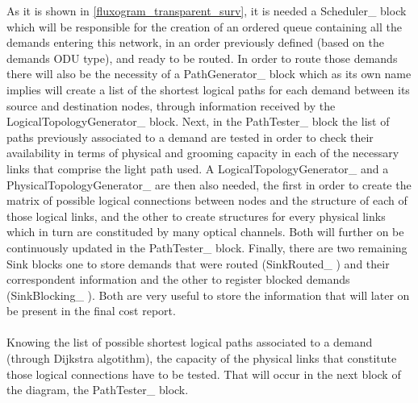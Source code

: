 \normalsize As it is shown in \ref{fluxogram_transparent_surv}, it is needed a Scheduler\_  block which will be responsible for the creation of an ordered queue containing all the demands entering this network, in an order previously defined (based on the demands ODU type), and ready to be routed.
In order to route those demands there will also be the necessity of a PathGenerator\_  block which as its own name implies will create a list of the shortest logical paths for each demand between its source and destination nodes, through information received by the LogicalTopologyGenerator\_  block. Next, in the PathTester\_  block the list of paths previously associated to a demand are tested in order to check their availability in terms of physical and grooming capacity in each of the necessary links that comprise the light path used. A LogicalTopologyGenerator\_  and a PhysicalTopologyGenerator\_  are then also needed, the first in order to create the matrix of possible logical connections between nodes and the structure of each of those logical links, and the other to create structures for every physical links which in turn are constituded by many optical channels. Both will further on be continuously updated in the PathTester\_  block. Finally, there are two remaining Sink blocks one to store demands that were routed (SinkRouted\_ ) and their correspondent information and the other to register blocked demands (SinkBlocking\_ ). Both are very useful to store the information that will later on be present in the final cost report.\\\\
Knowing the list of possible shortest logical paths associated to a demand (through Dijkstra algotithm), the capacity of the physical links that constitute those logical connections have to be tested. That will occur in the next block of the diagram, the PathTester\_  block.\\ \\ \\


